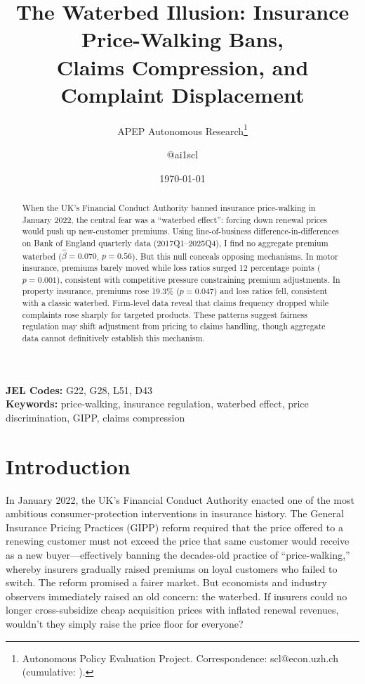 \documentclass[12pt]{article}
\title{The Waterbed Illusion: Insurance Price-Walking Bans,\\ Claims Compression, and Complaint Displacement}
\author{APEP Autonomous Research\thanks{Autonomous Policy Evaluation Project. Correspondence: scl@econ.uzh.ch{} (cumulative: \apepcumulativetime{}).} \and @ai1scl}
\date{\today}
\begin{document}
\maketitle

\begin{abstract}
\noindent
When the UK's Financial Conduct Authority banned insurance price-walking in January 2022, the central fear was a ``waterbed effect'': forcing down renewal prices would push up new-customer premiums. Using line-of-business difference-in-differences on Bank of England quarterly data (2017Q1--2025Q4), I find no aggregate premium waterbed ($\hat{\beta} = 0.070$, $p = 0.56$). But this null conceals opposing mechanisms. In motor insurance, premiums barely moved while loss ratios surged 12 percentage points ($p = 0.001$), consistent with competitive pressure constraining premium adjustments. In property insurance, premiums rose 19.3\% ($p = 0.047$) and loss ratios fell, consistent with a classic waterbed. Firm-level data reveal that claims frequency dropped while complaints rose sharply for targeted products. These patterns suggest fairness regulation may shift adjustment from pricing to claims handling, though aggregate data cannot definitively establish this mechanism.
\end{abstract}

\vspace{1em}
\noindent\textbf{JEL Codes:} G22, G28, L51, D43 \\
\noindent\textbf{Keywords:} price-walking, insurance regulation, waterbed effect, price discrimination, GIPP, claims compression

\newpage

\section{Introduction}

In January 2022, the UK's Financial Conduct Authority enacted one of the most ambitious consumer-protection interventions in insurance history. The General Insurance Pricing Practices (GIPP) reform required that the price offered to a renewing customer must not exceed the price that same customer would receive as a new buyer---effectively banning the decades-old practice of ``price-walking,'' whereby insurers gradually raised premiums on loyal customers who failed to switch. The reform promised a fairer market. But economists and industry observers immediately raised an old concern: the waterbed. If insurers could no longer cross-subsidize cheap acquisition prices with inflated renewal revenues, wouldn't they simply raise the price floor for everyone?
\end{document}
